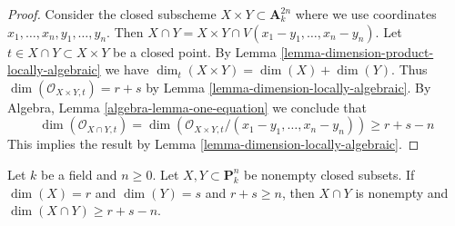 \begin{proof}
Consider the closed subscheme $X \times Y \subset \mathbf{A}^{2n}_k$
where we use coordinates $x_1, \ldots, x_n, y_1, \ldots, y_n$. Then
$X \cap Y = X \times Y \cap V(x_1 - y_1, \ldots, x_n - y_n)$.
Let $t \in X \cap Y \subset X \times Y$ be a closed point.
By Lemma \ref{lemma-dimension-product-locally-algebraic}
we have $\dim_t(X \times Y) = \dim(X) + \dim(Y)$.
Thus $\dim(\mathcal{O}_{X \times Y, t}) = r + s$ by
Lemma \ref{lemma-dimension-locally-algebraic}.
By Algebra, Lemma \ref{algebra-lemma-one-equation}
we conclude that
$$
\dim(\mathcal{O}_{X \cap Y, t}) =
\dim(\mathcal{O}_{X \times Y, t}/(x_1 - y_1, \ldots, x_n - y_n)) \geq
r + s - n
$$
This implies the result by Lemma \ref{lemma-dimension-locally-algebraic}.
\end{proof}

\begin{lemma}
\label{lemma-intersection-in-projective-space}
Let $k$ be a field and $n \geq 0$. Let $X, Y \subset \mathbf{P}^n_k$
be nonempty closed subsets. If $\dim(X) = r$ and $\dim(Y) = s$ and
$r + s \geq n$, then $X \cap Y$ is nonempty and
$\dim(X \cap Y) \geq r + s - n$.
\end{lemma}


